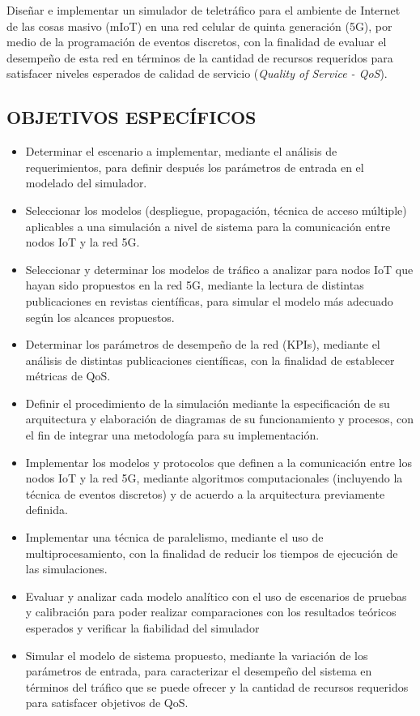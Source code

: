 Diseñar e implementar un simulador de teletráfico para el ambiente de Internet de las cosas masivo (mIoT) en una red celular de quinta generación (5G), por medio de la programación de eventos discretos, con la finalidad de evaluar el desempeño de esta red en términos de la cantidad de recursos requeridos para satisfacer niveles esperados de calidad de servicio (\textit{Quality of Service - QoS}).\newline

\subsection{OBJETIVOS ESPECÍFICOS}

\begin{itemize}
    \item Determinar el escenario a implementar, mediante el análisis de requerimientos, para definir después los parámetros de entrada en el modelado del simulador.
    \item Seleccionar los modelos (despliegue, propagación, técnica de acceso múltiple) aplicables a una simulación a nivel de sistema para la comunicación entre nodos IoT y la red 5G.
    \item Seleccionar y determinar los modelos de tráfico a analizar para nodos IoT que hayan sido propuestos en la red 5G, mediante la lectura de distintas publicaciones en revistas científicas, para simular el modelo más adecuado según los alcances propuestos.
    \item Determinar los parámetros de desempeño de la red (KPIs), mediante el análisis de distintas publicaciones científicas, con la finalidad de establecer métricas de QoS.
    \item Definir el procedimiento de la simulación mediante la especificación de su arquitectura y elaboración de diagramas de su funcionamiento y procesos, con el fin de integrar una metodología para su implementación.
    \item Implementar los modelos y protocolos que definen a la comunicación entre los nodos IoT y la red 5G, mediante algoritmos computacionales (incluyendo la técnica de eventos discretos) y de acuerdo a la arquitectura previamente definida.
    \item Implementar una técnica de paralelismo, mediante el uso de multiprocesamiento, con la finalidad de reducir los tiempos de ejecución de las simulaciones.
    \item Evaluar y analizar cada modelo analítico con el uso de escenarios de pruebas y calibración para poder realizar comparaciones con los resultados teóricos esperados y verificar la fiabilidad del simulador 
    \item Simular el modelo de sistema propuesto, mediante la variación de los parámetros de entrada, para caracterizar el desempeño del sistema en términos del tráfico que se puede ofrecer y la cantidad de recursos requeridos para satisfacer objetivos de QoS.
\end{itemize}

